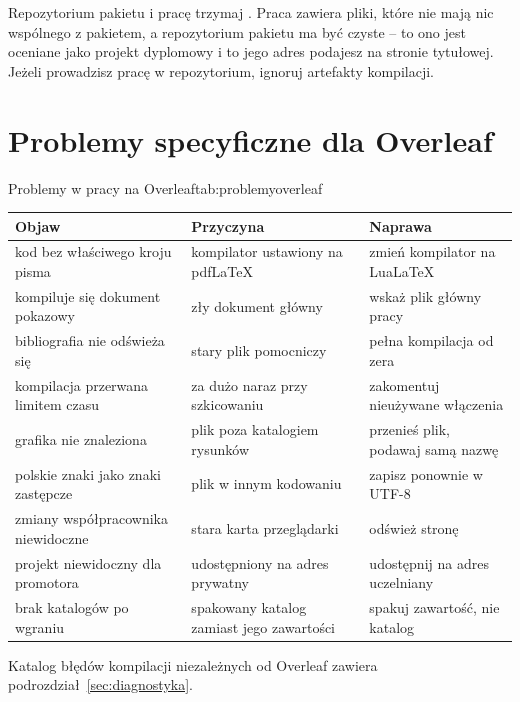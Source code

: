 Repozytorium pakietu i pracę trzymaj . Praca zawiera pliki, które nie mają nic wspólnego z pakietem, a repozytorium pakietu ma być czyste -- to ono jest oceniane jako projekt dyplomowy i to jego adres podajesz na stronie tytułowej. Jeżeli prowadzisz pracę w repozytorium, ignoruj artefakty kompilacji.

\section{Problemy specyficzne dla Overleaf}

\begin{tabelaepi}{Problemy w pracy na Overleaf}{tab:problemyoverleaf}
\begin{tabular}{@{}p{5cm}p{4.5cm}p{4.5cm}@{}}
\toprule
Objaw & Przyczyna & Naprawa \\
\midrule
kod bez właściwego kroju pisma & kompilator ustawiony na pdfLaTeX & zmień kompilator na LuaLaTeX \\
kompiluje się dokument pokazowy & zły dokument główny & wskaż plik główny pracy \\
bibliografia nie odświeża się & stary plik pomocniczy & pełna kompilacja od zera \\
kompilacja przerwana limitem czasu & za dużo naraz przy szkicowaniu & zakomentuj nieużywane włączenia \\
grafika nie znaleziona & plik poza katalogiem rysunków & przenieś plik, podawaj samą nazwę \\
polskie znaki jako znaki zastępcze & plik w innym kodowaniu & zapisz ponownie w UTF-8 \\
zmiany współpracownika niewidoczne & stara karta przeglądarki & odśwież stronę \\
projekt niewidoczny dla promotora & udostępniony na adres prywatny & udostępnij na adres uczelniany \\
brak katalogów po wgraniu & spakowany katalog zamiast jego zawartości & spakuj zawartość, nie katalog \\
\bottomrule
\end{tabular}
\end{tabelaepi}

Katalog błędów kompilacji niezależnych od Overleaf zawiera podrozdział~\ref{sec:diagnostyka}.

